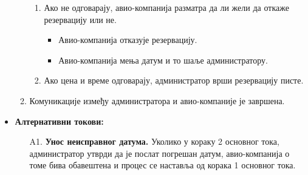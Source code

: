\documentclass{article}
\begin{document}
\begin{itemize}
\begin{enumerate}
                 \begin{enumerate}
                    \item Ако не одговарају, авио-компанија разматра да ли жели да откаже резервацију или не. 
                        \begin{itemize}
                            \item Авио-компанија отказује резервацију.
                            \item Авио-компанија мења датум и то шаље администратору.
                        \end{itemize}
                    \item Ако цена и време одговарају, администратор врши резервацију писте.
                \end{enumerate}
        \item Комуникације између администратора и авио-компаније је завршена.
    \end{enumerate}
    \item \textbf{Алтернативни токови:}
        \begin{itemize}
            \item[A1.] \textbf{Унос неисправног датума.} Уколико у кораку 2 основног тока, администратор утврди да је послат погрешан датум, авио-компанија о томе бива обавештена и процес се наставља од корака 1 основног тока.
        \end{itemize}
\end{itemize}
\end{document}
